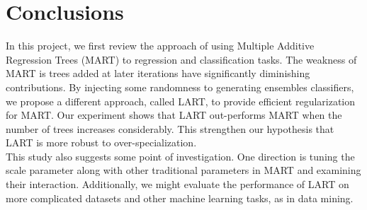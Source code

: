 \documentclass{article} %
\begin{document}
\begin{figure}	\centering
	

	
\end{figure}
\section{Conclusions}
In this project, we first review the approach of using Multiple Additive Regression Trees (MART) to regression and classification tasks. The weakness of MART is trees added at later iterations have significantly diminishing contributions. By injecting some randomness to generating ensembles classifiers, we propose a different approach, called LART, to provide efficient regularization for MART. Our experiment shows that LART out-performs MART when the number of trees increases considerably. This strengthen our hypothesis that LART is more robust to over-specialization.\\

This study also suggests some point of investigation. One direction is tuning the scale parameter along with other traditional parameters in MART and examining their interaction. Additionally, we might evaluate the performance of LART on more complicated datasets and other machine learning tasks, as in data mining.



\nocite{*}


\end{document}
